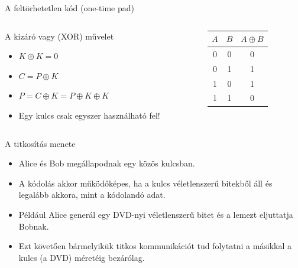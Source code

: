 \documentclass[12 pt]{beamer}
\begin{document}
\begin{frame}{A feltörhetetlen kód (one-time pad)}
  \begin{columns}
    \begin{column}{0.63\textwidth}
      \begin{block}{A kizáró vagy (XOR) művelet}
        \begin{itemize}
          \item{$K \oplus K = 0$}
          \item{$C = P \oplus K$}
          \item{$P = C \oplus K = P \oplus K \oplus K$}
          \item{Egy kulcs csak egyszer használható fel!}
        \end{itemize}
      \end{block}
    \end{column}
    \begin{column}{0.35\textwidth}
      \begin{center}
        \begin{tabular}{ |c|c||c| } 
         \hline
         $A$ & $B$ & $A \oplus B$ \\
          \hline
         0 & 0 & 0 \\ 
          \hline
         0 & 1 & 1 \\ 
          \hline
         1 & 0 & 1 \\ 
          \hline
         1 & 1 & 0 \\ 
          \hline
        \end{tabular}
      \end{center}
    \end{column}
  \end{columns}
  \begin{block}{A titkosítás menete}
    \begin{itemize}
      \item{Alice és Bob megállapodnak egy közös kulcsban.}
      \item{A kódolás akkor működőképes, ha a kulcs véletlenszerű bitekből áll és legalább akkora, mint a kódolandó adat.}
      \item{Például Alice generál egy DVD-nyi véletlenszerű bitet és a lemezt eljuttatja Bobnak.}
      \item{Ezt követően bármelyikük titkos kommunikációt tud folytatni a másikkal a kulcs (a DVD) méretéig bezárólag.}
    \end{itemize}
  \end{block}
\end{frame}
\end{document}
